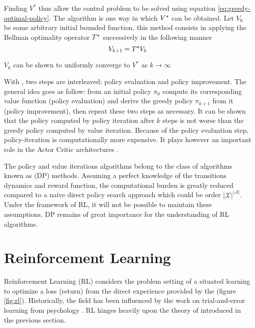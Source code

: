 Finding $V^*$ thus allow the control problem to be solved using
equation \ref{eq:greedy-optimal-policy}. The  algorithm is
one way in which $V^\star$ can be obtained. Let $V_0$ be some arbitrary initial
bounded function, this method consists in applying the Bellman optimality operator
$T^\star$ successively in the following manner
\begin{equation}
V_{k+1} = T^\star V_k \label{eq:value-iteration}
\end{equation}

$V_k$ can be shown \parencite{Ross1983} to uniformly converge to $V^*$ as $k \to \infty$

With , two steps are interleaved: policy evaluation and
policy improvement. The general idea goes as follow: from an initial policy $\pi_0$
compute its corresponding value function (policy evaluation) and derive the greedy
policy $\pi_{k+1}$ from it (policy improvement), then repeat these two steps as
necessary. It can be shown that the policy computed by policy
iteration after $k$ steps is not worse than the greedy policy computed
by value iteration. Because of the policy evaluation step, policy-iteration is
computationally more expensive. It plays however an important role in the Actor
Critic architectures \parencite{Sutton1984}.

The policy and value iterations algorithms belong to the class of algorithms known as
 (DP) methods. Assuming a perfect knowledge of the
transitions dynamics and reward function, the computational 
burden is greatly reduced compared to a naive direct policy search approach which could be order
$\left\vert \mathcal{X} \right\vert^{\left\vert \mathcal{A} \right\vert}$. Under the framework of RL, it will not be possible to maintain these assumptions. DP remains of great importance for the understanding of RL algorithms.

\section{Reinforcement Learning}

Reinforcement Learning (RL) considers the problem setting of a situated
 learning to optimize a loss (return) from the direct experience
provided by the  (figure \ref{fig:rl}). Historically, the field has
been influenced by the work on trial-and-error learning from
psychology \parencite{SuttonBarto1998}. RL hinges heavily upon the theory of \mdps introduced in the previous section.

